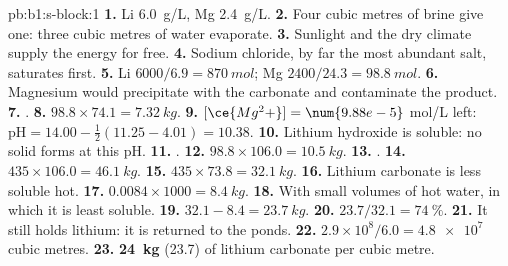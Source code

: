 \begin{solution}{pb:b1:s-block:1}
\textbf{1.} Li \qty{6.0}{g/L}, Mg \qty{2.4}{g/L}.
\textbf{2.} Four cubic metres of brine give one: three cubic metres of
water evaporate.
\textbf{3.} Sunlight and the dry climate supply the energy for free.
\textbf{4.} Sodium chloride, by far the most abundant salt, saturates
first.
\textbf{5.} Li $6000/6.9 = \qty{870}{mol}$; Mg $2400/24.3 = \qty{98.8}{mol}$.
\textbf{6.} Magnesium would precipitate with the carbonate and
contaminate the product.
\textbf{7.} .
\textbf{8.} $98.8 \times 74.1 = \qty{7.32}{kg}$.
\textbf{9.} $[\ce{Mg^2+}] = \num{9.88e-5}$ mol/L left: $\mathrm{pH} = 14.00 -
\frac12(11.25 - 4.01) = 10.38$.
\textbf{10.} Lithium hydroxide is soluble: no solid forms at this pH.
\textbf{11.} .
\textbf{12.} $98.8 \times 106.0 = \qty{10.5}{kg}$.
\textbf{13.} .
\textbf{14.} $435 \times 106.0 = \qty{46.1}{kg}$.
\textbf{15.} $435 \times 73.8 = \qty{32.1}{kg}$.
\textbf{16.} Lithium carbonate is less soluble hot.
\textbf{17.} $0.0084 \times 1000 = \qty{8.4}{kg}$.
\textbf{18.} With small volumes of hot water, in which it is least
soluble.
\textbf{19.} $32.1 - 8.4 = \qty{23.7}{kg}$.
\textbf{20.} $23.7/32.1 = \qty{74}{\percent}$.
\textbf{21.} It still holds lithium: it is returned to the ponds.
\textbf{22.} $2.9 \times 10^8/6.0 = \num{4.8e7}$ cubic metres.
\textbf{23.} \textbf{\qty{24}{kg}} (23.7) of lithium carbonate per cubic
metre.
\end{solution}
